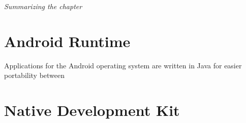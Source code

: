 \textit{Summarizing the chapter}

\section{Android Runtime}


Applications for the Android operating system are written in Java for easier portability between \cite[p.~33]{nolan2012decompiling}

\section{Native Development Kit}



